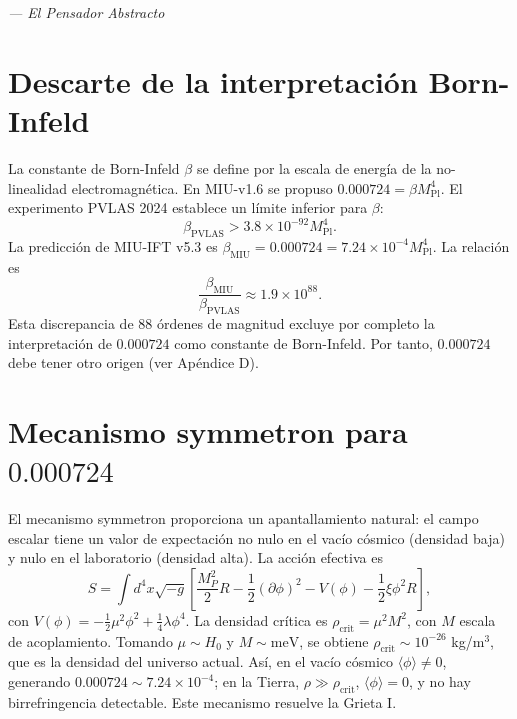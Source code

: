 \documentclass[12pt, a4paper]{article}
\theoremstyle{miuThm}
\theoremstyle{remark}
\newcommand{\eps}{0.000724}
\begin{document}
\begin{center}
\itshape
--- El Pensador Abstracto
\end{center}

\clearpage
\section{Descarte de la interpretación Born-Infeld}
\label{app:BI}

La constante de Born-Infeld $\beta$ se define por la escala de energía de la no-linealidad electromagnética. En MIU-v1.6 se propuso $\eps = \beta M_{\text{Pl}}^4$. El experimento PVLAS 2024 \cite{DellaValle2024} establece un límite inferior para $\beta$:
\begin{equation}
\beta_{\text{PVLAS}} > 3.8 \times 10^{-92} M_{\text{Pl}}^4.
\end{equation}
La predicción de MIU-IFT v5.3 es $\beta_{\text{MIU}} = \eps = 7.24\times10^{-4} M_{\text{Pl}}^4$. La relación es
\begin{equation}
\frac{\beta_{\text{MIU}}}{\beta_{\text{PVLAS}}} \approx 1.9 \times 10^{88}.
\end{equation}
Esta discrepancia de 88 órdenes de magnitud excluye por completo la interpretación de $\eps$ como constante de Born-Infeld. Por tanto, $\eps$ debe tener otro origen (ver Apéndice D).

\clearpage
\section{Mecanismo symmetron para $\eps$}
\label{app:symmetron}

El mecanismo symmetron \cite{Chameleon2025} proporciona un apantallamiento natural: el campo escalar tiene un valor de expectación no nulo en el vacío cósmico (densidad baja) y nulo en el laboratorio (densidad alta). La acción efectiva es
\begin{equation}
S = \int d^4x \sqrt{-g} \left[ \frac{M_P^2}{2} R - \frac12 (\partial\phi)^2 - V(\phi) - \frac12 \xi \phi^2 R \right],
\end{equation}
con $V(\phi) = -\frac12 \mu^2 \phi^2 + \frac14 \lambda \phi^4$. La densidad crítica es $\rho_{\text{crit}} = \mu^2 M^2$, con $M$ escala de acoplamiento. Tomando $\mu \sim H_0$ y $M \sim \text{meV}$, se obtiene $\rho_{\text{crit}} \sim 10^{-26}$ kg/m$^3$, que es la densidad del universo actual. Así, en el vacío cósmico $\langle\phi\rangle \neq 0$, generando $\eps \sim 7.24\times10^{-4}$; en la Tierra, $\rho \gg \rho_{\text{crit}}$, $\langle\phi\rangle = 0$, y no hay birrefringencia detectable. Este mecanismo resuelve la Grieta I.
\end{document}
